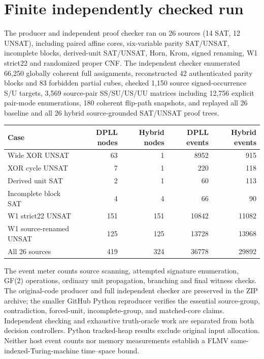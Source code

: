 \documentclass[11pt]{article}
\begin{document}
\section{Finite independently checked run}
The producer and independent proof checker ran on 26 sources (14 SAT, 12 UNSAT), including paired affine cores, six-variable parity SAT/UNSAT, incomplete blocks, derived-unit SAT/UNSAT, Horn, Krom, signed renaming, W1 strict22 and randomized proper CNF. The independent checker enumerated 66,250 globally coherent full assignments, reconstructed 42 authenticated parity blocks and 83 forbidden partial cubes, checked 1,150 source signed-occurrence S/U targets, 3,569 source-pair SS/SU/US/UU matrices including 12,756 explicit pair-mode enumerations, 180 coherent flip-path snapshots, and replayed all 26 baseline and all 26 hybrid source-grounded SAT/UNSAT proof trees.

\begin{center}
\begin{tabular}{lrrrr}\toprule
Case&DPLL nodes&Hybrid nodes&DPLL events&Hybrid events\\\midrule
Wide XOR UNSAT&63&1&8952&915\\
XOR cycle UNSAT&7&1&220&118\\
Derived unit SAT&2&1&60&113\\
Incomplete block SAT&4&4&66&90\\
W1 strict22 UNSAT&151&151&10842&11082\\
W1 source-renamed UNSAT&125&125&13728&13968\\
All 26 sources&419&324&36778&29892\\
\bottomrule\end{tabular}
\end{center}

The event meter counts source scanning, attempted signature enumeration, GF(2) operations, ordinary unit propagation, branching and final witness checks. The original-code producer and full independent checker are preserved in the ZIP archive; the smaller GitHub Python reproducer verifies the essential source-group, contradiction, forced-unit, incomplete-group, and matched-core claims. Independent checking and exhaustive truth-oracle work are separated from both decision controllers. Python tracked-heap results exclude original input allocation. Neither host event counts nor memory measurements establish a FLMV same-indexed-Turing-machine time--space bound.
\end{document}
